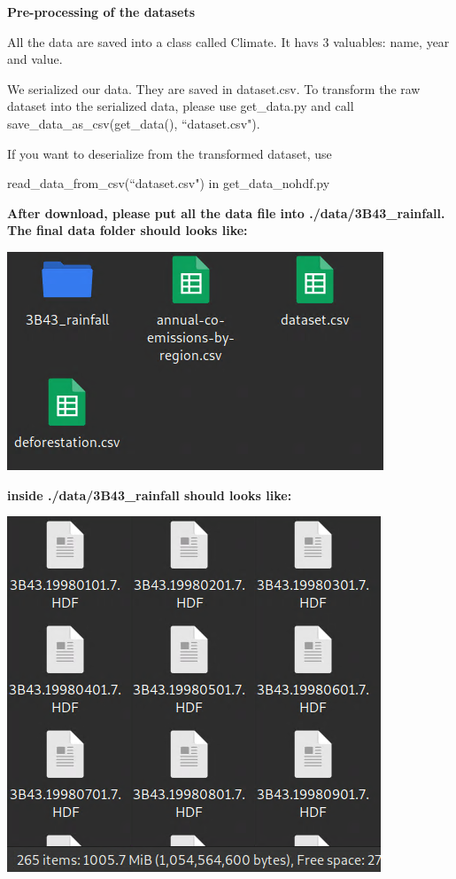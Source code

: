\documentclass[12pt]{article}
\begin{document}
\begin{enumerate}
\begin{text}
\textbf{Pre-processing of the datasets}

All the data are saved into a class called Climate. It havs 3 valuables: name, year and value.

We serialized our data. They are saved in dataset.csv. To transform the raw dataset into the serialized data, please use get\_data.py and call save\_data\_as\_csv(get\_data(), ``dataset.csv").

If you want to deserialize from the transformed dataset, use

read\_data\_from\_csv(``dataset.csv") in get\_data\_nohdf.py

\textbf{After download, please put all the data file into ./data/3B43\_rainfall. The final data folder should looks like:
}

\includegraphics[scale=0.5]{./datafolder.png}

\textbf{inside ./data/3B43\_rainfall should looks like:}

\includegraphics[scale=0.5]{./rainfallfolder.png}


\end{text}
\end{enumerate}
\end{document}
